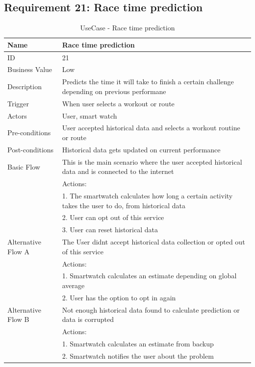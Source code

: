 \documentclass{article}
\begin{document}
	\subsection{Requirement 21: Race time prediction}
		\begin{table}[htbp]
			\centering
			\captionsetup{labelformat=empty}
			\caption{UseCase - Race time prediction}
			\begin{tabularx}{\textwidth}{|>{\raggedright\arraybackslash}p{}|X|}
				\hline
				Name             & Race time prediction                                \\ \hline
				ID               & 21                                                                                       \\ \hline
				Business Value   & Low                                                                                    \\ \hline
				Description      & Predicts the time it will take to finish a certain challenge depending on previous performane \\ \hline
				Trigger          & When user selects a workout or route \\ \hline
				Actors           & User, smart watch                                 \\ \hline
				Pre-conditions   & User accepted historical data and selects a workout routine or route                                    \\ \hline
				Post-conditions  & Historical data gets updated on current performance                                                         \\ \hline
				Basic Flow       & This is the main scenario where the user accepted historical data and is connected to the internet \\ \hline
								 & Actions: \\
								 & 1. The smartwatch calculates how long a certain activity takes the user to do, from historical data \\
								 & 2. User can opt out of this service \\
								 & 3. User can reset historical data \\ \hline
				Alternative Flow A & The User didnt accept historical data collection or opted out of this service \\
								 & Actions: \\
								 & 1. Smartwatch calculates an estimate depending on global average \\
								 & 2. User has the option to opt in again \\ \hline
				Alternative Flow B & Not enough historical data found to calculate prediction or data is corrupted \\
								 & Actions: \\
								 & 1. Smartwatch calculates an estimate from backup \\
								 & 2. Smartwatch notifies the user about the problem \\ \hline
			\end{tabularx}
		\end{table}
\end{document}
